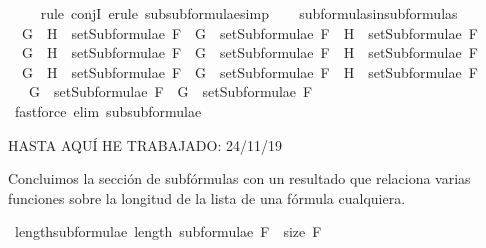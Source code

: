 \begin{isabellebody}
%
\isadelimproof
\ \ \ %
\endisadelimproof
%
\isatagproof
{}\isamarkupfalse%
\ {\isacharparenleft}{\isacharparenleft}rule\ conjI{\isacharparenright}{\isacharplus}{\isacharcomma}\ {\isacharparenleft}erule\ subsubformulae{\isacharcomma}simp{\isacharparenright}{\isacharplus}{\isacharparenright}{\isacharplus}\isanewline
\ \ \isamarkupfalse%
%
\endisatagproof
{\isafoldproof}%
%
\isadelimproof
\isanewline
%
\endisadelimproof
\isanewline
{}\isamarkupfalse%
\ subformulas{\isacharunderscore}in{\isacharunderscore}subformulas{\isacharcolon}\isanewline
\ \ {\isachardoublequoteopen}G\ \isactrlbold {\isasymand}\ H\ {\isasymin}\ setSubformulae\ F\ {\isasymLongrightarrow}\ G\ {\isasymin}\ setSubformulae\ F\ {\isasymand}\ H\ {\isasymin}\ setSubformulae\ F{\isachardoublequoteclose}\isanewline
\ \ {\isachardoublequoteopen}G\ \isactrlbold {\isasymor}\ H\ {\isasymin}\ setSubformulae\ F\ {\isasymLongrightarrow}\ G\ {\isasymin}\ setSubformulae\ F\ {\isasymand}\ H\ {\isasymin}\ setSubformulae\ F{\isachardoublequoteclose}\isanewline
\ \ {\isachardoublequoteopen}G\ \isactrlbold {\isasymrightarrow}\ H\ {\isasymin}\ setSubformulae\ F\ {\isasymLongrightarrow}\ G\ {\isasymin}\ setSubformulae\ F\ {\isasymand}\ H\ {\isasymin}\ setSubformulae\ F{\isachardoublequoteclose}\isanewline
\ \ {\isachardoublequoteopen}\isactrlbold {\isasymnot}\ G\ {\isasymin}\ setSubformulae\ F\ {\isasymLongrightarrow}\ G\ {\isasymin}\ setSubformulae\ F{\isachardoublequoteclose}\isanewline
%
\isadelimproof
\ \ %
\endisadelimproof
%
\isatagproof
{}\isamarkupfalse%
\ {\isacharparenleft}fastforce\ elim{\isacharcolon}\ subsubformulae{\isacharparenright}{\isacharplus}%
\endisatagproof
{\isafoldproof}%
%
\isadelimproof
%
\endisadelimproof
%
\begin{isamarkuptext}%
HASTA AQUÍ HE TRABAJADO: 24/11/19%
\end{isamarkuptext}\isamarkuptrue%
%
\begin{isamarkuptext}%
Concluimos la sección de subfórmulas con un resultado que relaciona varias funciones
sobre la longitud de la lista  de una fórmula  cualquiera.%
\end{isamarkuptext}\isamarkuptrue%
\isamarkupfalse%
\ length{\isacharunderscore}subformulae{\isacharcolon}\ {\isachardoublequoteopen}length\ {\isacharparenleft}subformulae\ F{\isacharparenright}\ {\isacharequal}\ size\ F{\isachardoublequoteclose}\ \isanewline
%
\isadelimproof
\ \ %
\endisadelimproof
%
\isatagproof
{}\isamarkupfalse%
%
\endisatagproof

\end{isabellebody}
